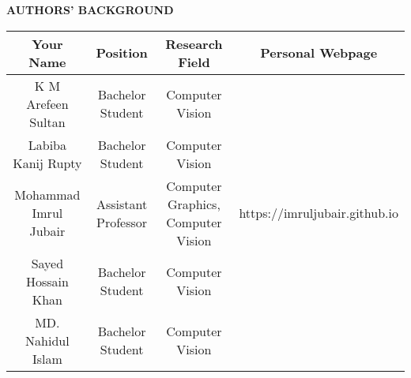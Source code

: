 \onecolumn

\begin{flushleft}
\begin{center}
\Huge \textbf{AUTHORS' BACKGROUND}    
\end{center}


\normalsize
\begin{table*}[!htb] 
\renewcommand{\arraystretch}{3}
\normalsize\addtolength{\tabcolsep}{10pt}
\begin{tabular}{ |c|c|c|c| }

 \hline
Your Name & Position & Research Field & Personal Webpage \\ 
 \hline 
 K M Arefeen Sultan & Bachelor Student   & Computer Vision &  \\
 \hline
 Labiba Kanij Rupty &  Bachelor Student   &  Computer Vision  &  \\
 \hline
  Mohammad Imrul Jubair & Assistant Professor   & Computer Graphics, Computer Vision  &  https://imruljubair.github.io \\
 \hline
 Sayed Hossain Khan &  Bachelor Student   &  Computer Vision  &  \\
 \hline
 MD. Nahidul Islam &  Bachelor Student   & Computer Vision  &  \\
 \hline
\end{tabular}
\renewcommand{\arraystretch}{1}
\end{table*}

\end{flushleft}
\normalsize
